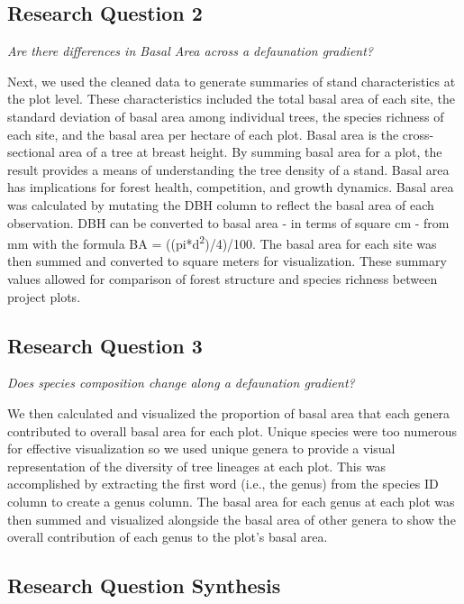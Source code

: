 \documentclass[
  12pt,
]{article}
\begin{document}
\hypertarget{research-question-2}{%
\subsection{Research Question 2}\label{research-question-2}}

\emph{Are there differences in Basal Area across a defaunation
gradient?}

Next, we used the cleaned data to generate summaries of stand
characteristics at the plot level. These characteristics included the
total basal area of each site, the standard deviation of basal area
among individual trees, the species richness of each site, and the basal
area per hectare of each plot. Basal area is the cross-sectional area of
a tree at breast height. By summing basal area for a plot, the result
provides a means of understanding the tree density of a stand. Basal
area has implications for forest health, competition, and growth
dynamics. Basal area was calculated by mutating the DBH column to
reflect the basal area of each observation. DBH can be converted to
basal area - in terms of square cm - from mm with the formula BA =
((pi*d\textsuperscript{2})/4)/100. The basal area for each site was then
summed and converted to square meters for visualization. These summary
values allowed for comparison of forest structure and species richness
between project plots.

\hypertarget{research-question-3}{%
\subsection{Research Question 3}\label{research-question-3}}

\emph{Does species composition change along a defaunation gradient?}

We then calculated and visualized the proportion of basal area that each
genera contributed to overall basal area for each plot. Unique species
were too numerous for effective visualization so we used unique genera
to provide a visual representation of the diversity of tree lineages at
each plot. This was accomplished by extracting the first word (i.e., the
genus) from the species ID column to create a genus column. The basal
area for each genus at each plot was then summed and visualized
alongside the basal area of other genera to show the overall
contribution of each genus to the plot's basal area.

\hypertarget{research-question-synthesis}{%
\subsection{Research Question
Synthesis}\label{research-question-synthesis}}
\end{document}
